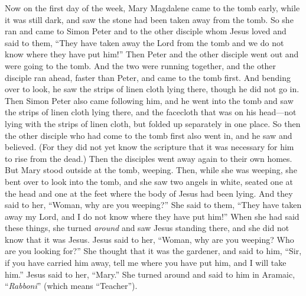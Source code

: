 \begin{biblechapter} %
 Now on the first day of the week, Mary Magdalene came to the tomb early, while it was still dark, and saw the stone had been taken away from the tomb.
\verse So she ran and came to Simon Peter and to the other disciple whom Jesus loved and said to them, “They have taken away the Lord from the tomb and we do not know where they have put him!”
\verse Then Peter and the other disciple went out and were going to the tomb.
\verse And the two were running together, and the other disciple ran ahead, faster than Peter, and came to the tomb first.
\verse And bending over to look, he saw the strips of linen cloth lying there, though he did not go in.
\verse Then Simon Peter also came following him, and he went into the tomb and saw the strips of linen cloth lying there,
\verse and the facecloth that was on his head—not lying with the strips of linen cloth, but folded up separately in one place.
\verse So then the other disciple who had come to the tomb first also went in, and he saw and believed.
\verse (For they did not yet know the scripture that it was necessary for him to rise from the dead.)
 Then the disciples went away again to their own homes.
\verse But Mary stood outside at the tomb, weeping. Then, while she was weeping, she bent over to look into the tomb,
\verse and she saw two angels in white, seated one at the head and one at the feet where the body of Jesus had been lying.
\verse And they said to her, “Woman, why are you weeping?” She said to them, “They have taken away my Lord, and I do not know where they have put him!”
\verse When she had said these things, she turned \textit{around} and saw Jesus standing there, and she did not know that it was Jesus.
\verse Jesus said to her, “Woman, why are you weeping? Who are you looking for?” She thought that it was the gardener, and said to him, “Sir, if you have carried him away, tell me where you have put him, and I will take him.”
\verse Jesus said to her, “Mary.” She turned around and said to him in Aramaic, “\textit{Rabboni}” (which means “Teacher”).

\end{biblechapter}
